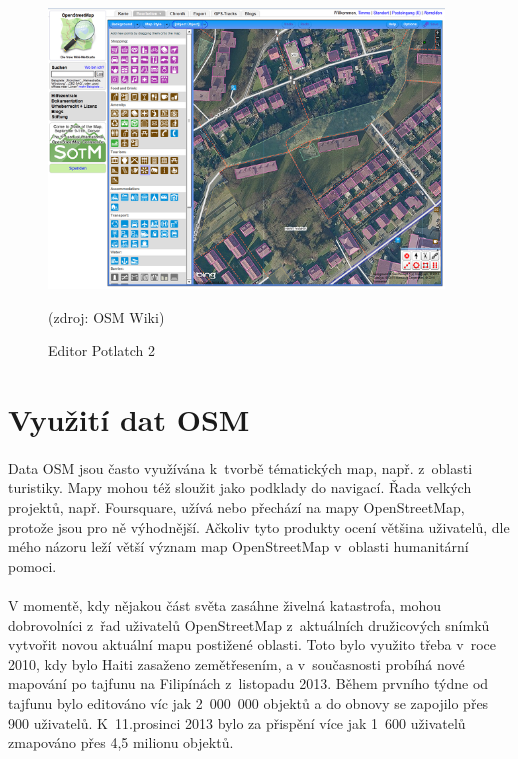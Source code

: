 \documentclass[11pt,a4paper,titlepage,oneside]{book}
\begin{document}


                        
		\begin{figure}[!h]
			\begin{center}
				\includegraphics[width=10.5cm]{obrazky/p2_osm.png}
				\caption{Editor Potlatch 2}(zdroj: OSM Wiki\cite{wiki_p2})
			\end{center}
		\end{figure}

	\section{Využití dat \ac{OSM}}
		\paragraph{} Data \ac{OSM} jsou často využívána k~tvorbě tématických map, např. z~oblasti turistiky. Mapy mohou též sloužit jako podklady do navigací. Řada velkých projektů, např. Foursquare, užívá nebo přechází na mapy OpenStreetMap, protože jsou pro ně výhodnější. Ačkoliv tyto produkty ocení většina uživatelů, dle mého názoru leží větší význam map OpenStreetMap v~oblasti humanitární pomoci.
		\paragraph{}V momentě, kdy nějakou část světa zasáhne živelná katastrofa, mohou dobrovolníci z~řad uživatelů OpenStreetMap z~aktuálních družicových snímků vytvořit novou aktuální mapu postižené oblasti. Toto bylo využito třeba v~roce 2010, kdy bylo Haiti zasaženo zemětřesením, a v~současnosti probíhá nové mapování po tajfunu na Filipínách z~listopadu 2013. Během prvního týdne od tajfunu bylo editováno víc jak 2~000~000 objektů a do obnovy se zapojilo přes 900 uživatelů. K~11.prosinci 2013 bylo za přispění více jak 1~600 uživatelů zmapováno přes 4,5 milionu objektů\cite{wiki_tajfun}.
\end{document}
